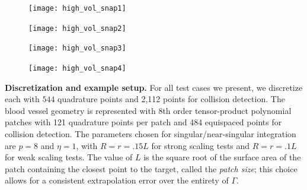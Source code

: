 \begin{figure}[!htb]
\end{figure}

\begin{figure}[!htb]
\centering
\begin{minipage}[b]{0.2\textwidth}
    \texttt{[image: high\_vol\_snap1]}
\end{minipage}
\hspace{2ex}
\begin{minipage}[b]{0.2\textwidth}
    \texttt{[image: high\_vol\_snap2]}
\end{minipage}
\vfill
\begin{minipage}[b]{0.2\textwidth}
    \texttt{[image: high\_vol\_snap3]}
\end{minipage}
\hspace{2ex}
\begin{minipage}[b]{0.2\textwidth}
    \texttt{[image: high\_vol\_snap4]}
\end{minipage}
\end{figure}
\textbf{Discretization and example setup. }
For all test cases we present, we discretize each \rbc with $544$ quadrature
points and 2,112 points for collision detection.
The blood vessel geometry is represented with 8th order tensor-product
polynomial patches with  121 quadrature points per patch and 484
equispaced points for collision detection.
The parameters chosen for singular/near-singular integration are $p=8$ and $\eta=1$, with $R=r=.15L$ for strong scaling tests and $R=r=.1L$ for weak scaling tests.
The value of $L$ is the square root of the surface area of the patch containing the closest point to the target, called the \emph{patch size}; this choice allows for a consistent extrapolation error over the entirety of $\Gamma$.

